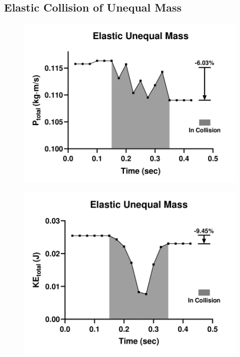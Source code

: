 \newpage
\subsection{Elastic Collision of Unequal Mass}
\begin{figure}[!htb]
	\centering
	\begin{minipage}{.5\textwidth}
		\centering
		\includegraphics[width=\linewidth]{eup}
		\label{fig:test1}
	\end{minipage}%
	\begin{minipage}{.5\textwidth}
		\centering
		\includegraphics[width=\linewidth]{euk}
		\label{fig:test2}
	\end{minipage}
\end{figure}

